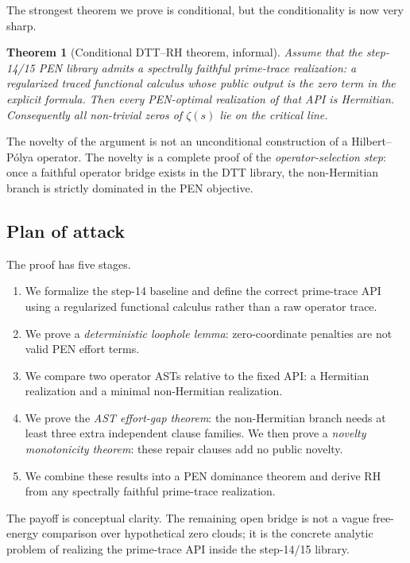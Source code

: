 \documentclass[11pt,a4paper]{article}
\theoremstyle{plain}
\newtheorem{theorem}{Theorem}[section]
\theoremstyle{definition}
\theoremstyle{remark}
\begin{document}
The strongest theorem we prove is conditional, but the conditionality is now very sharp.

\begin{theorem}[Conditional DTT--RH theorem, informal]
Assume that the step-14/15 PEN library admits a spectrally faithful prime-trace realization: a regularized traced functional calculus whose public output is the zero term in the explicit formula. Then every PEN-optimal realization of that API is Hermitian. Consequently all non-trivial zeros of $\zeta(s)$ lie on the critical line.
\end{theorem}

The novelty of the argument is not an unconditional construction of a Hilbert--P\'olya operator. The novelty is a complete proof of the \emph{operator-selection step}: once a faithful operator bridge exists in the DTT library, the non-Hermitian branch is strictly dominated in the PEN objective.

\subsection{Plan of attack}

The proof has five stages.

\begin{enumerate}[leftmargin=2em]
  \item We formalize the step-14 baseline and define the correct prime-trace API using a regularized functional calculus rather than a raw operator trace.
  \item We prove a \emph{deterministic loophole lemma}: zero-coordinate penalties are not valid PEN effort terms.
  \item We compare two operator ASTs relative to the fixed API: a Hermitian realization and a minimal non-Hermitian realization.
  \item We prove the \emph{AST effort-gap theorem}: the non-Hermitian branch needs at least three extra independent clause families. We then prove a \emph{novelty monotonicity theorem}: these repair clauses add no public novelty.
  \item We combine these results into a PEN dominance theorem and derive RH from any spectrally faithful prime-trace realization.
\end{enumerate}

The payoff is conceptual clarity. The remaining open bridge is not a vague free-energy comparison over hypothetical zero clouds; it is the concrete analytic problem of realizing the prime-trace API inside the step-14/15 library.
\end{document}
